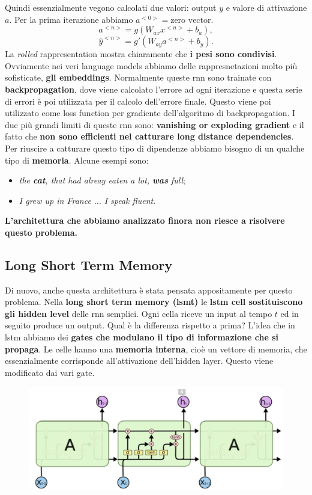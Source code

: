 Quindi essenzialmente vegono calcolati due valori: output $y$ e valore di attivazione $a$. Per la prima
iterazione abbiamo $a^{<0>}=\text{zero vector}$.
\begin{equation}
   a^{<n>}=g(W_{ax}x^{<n>}+b_a),
\end{equation}
\begin{equation}
   \hat{y}^{<n>}=g'(W_{ay}a^{<n>}+b_y).
\end{equation}
La \textit{rolled} rappresentation mostra chiaramente che \textbf{i pesi sono condivisi}.
Ovviamente nei veri language models abbiamo delle rappresnetazioni molto più sofisticate, 
\textbf{gli embeddings}. Normalmente queste rnn sono trainate con \textbf{backpropagation},
dove viene calcolato l'errore ad ogni iterazione e questa serie di errori è 
poi utilizzata per il calcolo dell'errore finale. Questo viene poi utilizzato come 
loss function per gradiente dell'algoritmo di backpropagation. 
I due più grandi limiti di queste rnn sono: \textbf{vanishing or exploding gradient} e 
il fatto che \textbf{non sono efficienti nel catturare long distance dependencies}.
\newpage
Per riuscire a catturare questo tipo di dipendenze abbiamo bisogno di un qualche tipo di \textbf{memoria}.
Alcune esempi sono:
\begin{itemize}
   \item \textit{the \textbf{cat}, that had alreay eaten a lot, \textbf{was} full};
   \item \textit{I grew up in France $\dots$ I speak fluent}.
\end{itemize}
\textbf{L'architettura che abbiamo analizzato finora non riesce a risolvere questo problema.}
\subsection{Long Short Term Memory}
Di nuovo, anche questa architettura è stata pensata appositamente per questo problema.
Nella \textbf{long short term memory (lsmt)} le \textbf{lstm cell sostituiscono gli hidden level} 
delle rnn semplici. Ogni cella riceve un input al tempo $t$ ed in seguito produce un output. 
Qual è la differenza rispetto a prima? L'idea che in lstm abbiamo dei \textbf{gates che 
modulano il tipo di informazione che si propaga}. Le celle hanno una \textbf{memoria interna},
cioè un vettore di memoria, che essenzialmente corrisponde all'attivazione dell'hidden layer. 
Questo viene modificato dai vari gate. 
\begin{figure}[!h]
   \includegraphics[scale=.5]{images/rnn/lstm.png}
   \centering
\end{figure}



